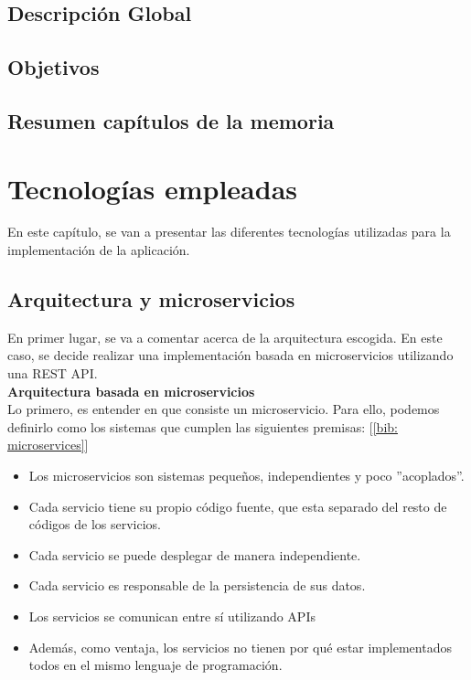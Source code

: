 \documentclass[a4paper, oneside, 12pt]{book}
\begin{document}
	\section{Descripción Global}
	
	\section{Objetivos}
	
	\section{Resumen capítulos de la memoria}
	
	\pagebreak
	
	\chapter{Tecnologías empleadas}
	
	\noindent En este capítulo, se van a presentar las diferentes tecnologías utilizadas para la implementación de la aplicación.
	
	\section{Arquitectura y microservicios}
	
	\noindent En primer lugar, se va a comentar acerca de la arquitectura escogida. En este caso, se decide realizar una implementación basada en microservicios utilizando una REST API. \\
	
	
	\noindent \textbf{\large Arquitectura basada en \textbf{microservicios}} \\
	
	\noindent Lo primero, es entender en que consiste un microservicio. Para ello, podemos definirlo como los sistemas que cumplen las siguientes premisas: [\ref{bib: microservices}]
	
	\begin{itemize}
		\item Los microservicios son sistemas pequeños, independientes y poco ''acoplados''.
		
		\item Cada servicio tiene su propio código fuente, que esta separado del resto de códigos de los servicios.
		
		\item Cada servicio se puede desplegar de manera independiente. 
		
		\item Cada servicio es responsable de la persistencia de sus datos.
		
		\item Los servicios se comunican entre sí utilizando APIs
		
		\item Además, como ventaja, los servicios no tienen por qué estar implementados todos en el mismo lenguaje de programación.
	\end{itemize}
\end{document}
